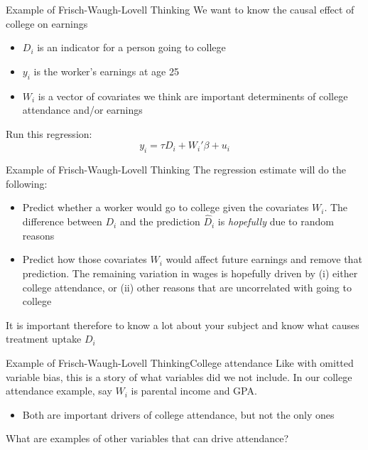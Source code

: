 \documentclass[aspectratio=169,t,11pt,table]{beamer}
\begin{document}
\begin{frame}{Example of Frisch-Waugh-Lovell Thinking}
  We want to know the causal effect of college on earnings
  \begin{itemize}
    \item $D_i$ is an indicator for a person going to college
    
    \item $y_i$ is the worker's earnings at age 25
    
    \item $W_i$ is a vector of covariates we think are important determinents of college attendance and/or earnings
  \end{itemize}

  Run this regression:
  $$
    y_i = \tau D_i + W_i' \beta + u_i
  $$

\end{frame}

\begin{frame}{Example of Frisch-Waugh-Lovell Thinking}
  The regression estimate will do the following:
  \begin{itemize}
    \item Predict whether a worker would go to college given the covariates $W_i$. The difference between $D_i$ and the prediction $\hat{D}_i$ is \emph{hopefully} due to random reasons
    
    \item Predict how those covariates $W_i$ would affect future earnings and remove that prediction. The remaining variation in wages is hopefully driven by (i) either college attendance, or (ii) other reasons that are uncorrelated with going to college
  \end{itemize}

  \bigskip
  It is important therefore to know a lot about your subject and know what causes treatment uptake $D_i$
\end{frame}

\begin{frame}{Example of Frisch-Waugh-Lovell Thinking}{College attendance}
  Like with omitted variable bias, this is a story of what variables did we not include. In our college attendance example, say $W_i$ is parental income and GPA. 
  \begin{itemize}
    \item Both are important drivers of college attendance, but not the only ones
  \end{itemize}

  \bigskip
  What are examples of other variables that can drive attendance?
\end{frame}
\end{document}
